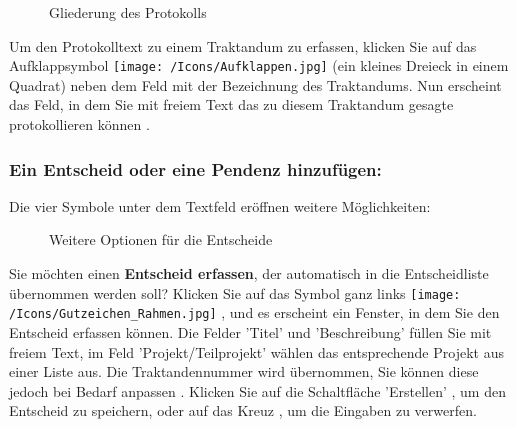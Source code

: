 \begin{figure}[H]
\caption{Gliederung des Protokolls}
\end{figure}

Um den Protokolltext zu einem Traktandum zu erfassen, klicken Sie auf das Aufklappsymbol \texttt{[image: /Icons/Aufklappen.jpg]}  (ein kleines Dreieck in einem Quadrat) neben dem Feld mit der Bezeichnung des Traktandums. Nun erscheint das Feld, in dem Sie mit freiem Text das zu diesem Traktandum gesagte protokollieren können .

\subsubsection{Ein Entscheid oder eine Pendenz hinzufügen:}

Die vier Symbole unter dem Textfeld eröffnen weitere Möglichkeiten:

\begin{figure}[H]
\caption{Weitere Optionen für die Entscheide}
\end{figure}

Sie möchten einen \textbf{Entscheid erfassen}, der automatisch in die Entscheidliste übernommen werden soll? Klicken Sie auf das Symbol ganz links \texttt{[image: /Icons/Gutzeichen\_Rahmen.jpg]} , und es erscheint ein Fenster, in dem Sie den Entscheid erfassen können. Die Felder 'Titel'  und 'Beschreibung'  füllen Sie mit freiem Text, im Feld 'Projekt/Teilprojekt'  wählen das entsprechende Projekt aus einer Liste aus. Die Traktandennummer wird übernommen, Sie können diese jedoch bei Bedarf anpassen . Klicken Sie auf die Schaltfläche 'Erstellen' , um den Entscheid zu speichern, oder auf das Kreuz , um die Eingaben zu verwerfen.

